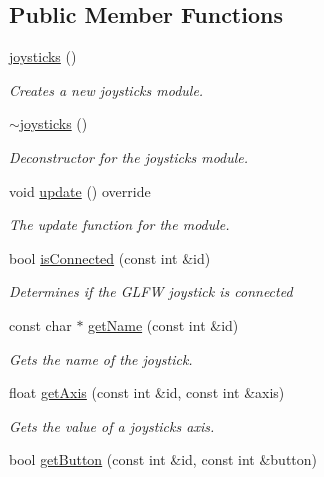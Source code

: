 \subsection*{Public Member Functions}
\begin{DoxyCompactItemize}
\item 
\hyperlink{classflounder_1_1joysticks_ad0676c90afa28b4fb69de64c253e9c34}{joysticks} ()
\begin{DoxyCompactList}\small\item\em Creates a new joysticks module. \end{DoxyCompactList}\item 
\hyperlink{classflounder_1_1joysticks_aaab9cf61c7c5d6736742347c7c657ed8}{$\sim$joysticks} ()
\begin{DoxyCompactList}\small\item\em Deconstructor for the joysticks module. \end{DoxyCompactList}\item 
void \hyperlink{classflounder_1_1joysticks_a346fc03cae7164d6eb927333d1ae725f}{update} () override
\begin{DoxyCompactList}\small\item\em The update function for the module. \end{DoxyCompactList}\item 
bool \hyperlink{classflounder_1_1joysticks_a5474ad44039f8b1bdcd73a268d09e7f2}{is\+Connected} (const int \&id)
\begin{DoxyCompactList}\small\item\em Determines if the G\+L\+FW joystick is connected \end{DoxyCompactList}\item 
const char $\ast$ \hyperlink{classflounder_1_1joysticks_ae471533fed9714160b5af9e22b00c427}{get\+Name} (const int \&id)
\begin{DoxyCompactList}\small\item\em Gets the name of the joystick. \end{DoxyCompactList}\item 
float \hyperlink{classflounder_1_1joysticks_a67c5fd2f77004c37cf1720c985c9d6f9}{get\+Axis} (const int \&id, const int \&axis)
\begin{DoxyCompactList}\small\item\em Gets the value of a joysticks axis. \end{DoxyCompactList}\item 
bool \hyperlink{classflounder_1_1joysticks_a908373adb0a8ca4818b7d49b273d4622}{get\+Button} (const int \&id, const int \&button)

\end{DoxyCompactItemize}
